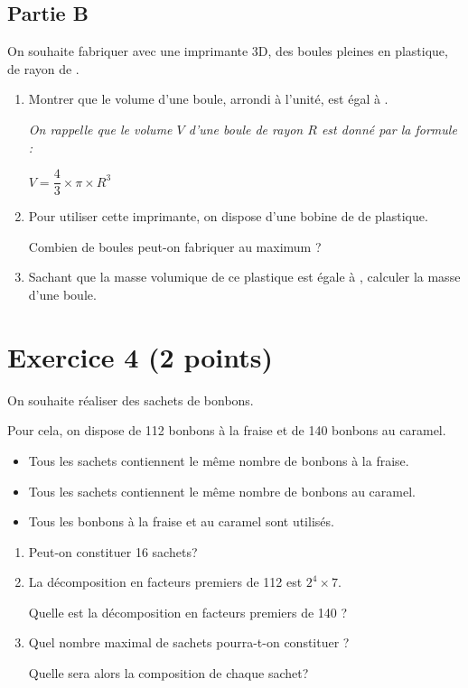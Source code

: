 \documentclass[12pt,a4paper,french]{article}
\begin{document}
\subsection*{Partie B}
On souhaite fabriquer avec une imprimante 3D, des boules pleines en plastique, de rayon de .

\begin{enumerate}
	\item Montrer que le volume d'une boule, arrondi à l'unité, est égal à .

	\emph{On rappelle que le volume $V$ d'une boule de rayon $R$ est donné par la formule :}

	$V=\dfrac{4}{3} \times \pi \times R^{3}$

	\item Pour utiliser cette imprimante, on dispose d'une bobine de  de plastique.

	Combien de boules peut-on fabriquer au maximum ?

	\item Sachant que la masse volumique de ce plastique est égale à , calculer la masse d'une boule.
\end{enumerate}

\section*{Exercice 4 (2 points)}
On souhaite réaliser des sachets de bonbons.

Pour cela, on dispose de 112 bonbons à la fraise et de 140 bonbons au caramel.

\begin{itemize}[left=5mm]
	\item Tous les sachets contiennent le même nombre de bonbons à la fraise.

	\item Tous les sachets contiennent le même nombre de bonbons au caramel.

	\item Tous les bonbons à la fraise et au caramel sont utilisés.
\end{itemize}

\begin{enumerate}
	\item Peut-on constituer 16 sachets?

	\item La décomposition en facteurs premiers de 112 est $2^{4} \times 7$.

	Quelle est la décomposition en facteurs premiers de 140 ?

	\item Quel nombre maximal de sachets pourra-t-on constituer ?

	Quelle sera alors la composition de chaque sachet?
\end{enumerate}

\end{document}

